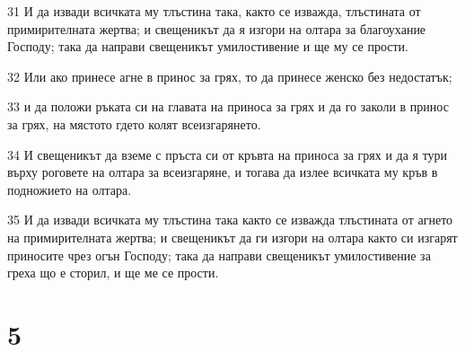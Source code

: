 \par 31 И да извади всичката му тлъстина така, както се изважда, тлъстината от примирителната жертва; и свещеникът да я изгори на олтара за благоухание Господу; така да направи свещеникът умилостивение и ще му се прости.
\par 32 Или ако принесе агне в принос за грях, то да принесе женско без недостатък;
\par 33 и да положи ръката си на главата на приноса за грях и да го заколи в принос за грях, на мястото гдето колят всеизгарянето.
\par 34 И свещеникът да вземе с пръста си от кръвта на приноса за грях и да я тури върху роговете на олтара за всеизгаряне, и тогава да излее всичката му кръв в подножието на олтара.
\par 35 И да извади всичката му тлъстина така както се изважда тлъстината от агнето на примирителната жертва; и свещеникът да ги изгори на олтара както си изгарят приносите чрез огън Господу; така да направи свещеникът умилостивение за греха що е сторил, и ще ме се прости.

\chapter{5}

